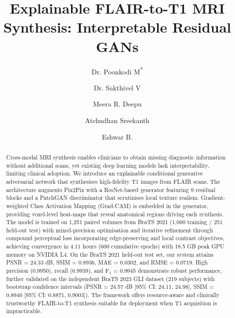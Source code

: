 \documentclass[runningheads]{llncs}
\begin{document}
\title{Explainable FLAIR-to-T1 MRI Synthesis: Interpretable Residual GANs}

\author {Dr. Poonkodi M\textsuperscript{*} \and Dr. Sakthivel V \and Meera R. Deepu \and Atchudhan Sreekanth \and Eshwar B.}


\maketitle
\begin{abstract}
Cross-modal MRI synthesis enables clinicians to obtain missing diagnostic information without additional scans, yet existing deep learning models lack interpretability, limiting clinical adoption. We introduce an explainable conditional generative adversarial network that synthesises high-fidelity T1 images from FLAIR scans. The architecture augments Pix2Pix with a ResNet-based generator featuring 9 residual blocks and a PatchGAN discriminator that scrutinises local texture realism. Gradient-weighted Class Activation Mapping (Grad-CAM) is embedded in the generator, providing voxel-level heat-maps that reveal anatomical regions driving each synthesis. The model is trained on 1,251 paired volumes from BraTS 2021 (1,000 training / 251 held-out test) with mixed-precision optimisation and iterative refinement through compound perceptual loss incorporating edge-preserving and local contrast objectives, achieving convergence in 4.11 hours (600 cumulative epochs) with 18.5 GB peak GPU memory on NVIDIA L4. On the BraTS 2021 held-out test set, our system attains PSNR = 24.33 dB, SSIM = 0.8936, MAE = 0.0302, and RMSE = 0.0719. High precision (0.9950), recall (0.9939), and F$_{1}$ = 0.9945 demonstrate robust performance, further validated on the independent BraTS 2023 GLI dataset (219 subjects) with bootstrap confidence intervals (PSNR = 24.57 dB [95\% CI: 24.11, 24.98], SSIM = 0.8940 [95\% CI: 0.8871, 0.9003]). The framework offers resource-aware and clinically trustworthy FLAIR-to-T1 synthesis suitable for deployment when T1 acquisition is impracticable.


\end{abstract}
\end{document}
